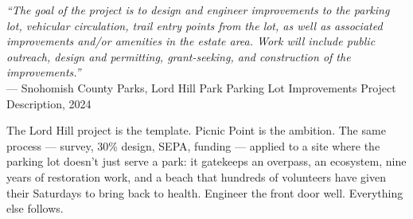 \documentclass[11pt,letterpaper]{article}
\begin{document}
\begin{quotebox}
\textit{``The goal of the project is to design and engineer improvements to the parking lot, vehicular circulation, trail entry points from the lot, as well as associated improvements and/or amenities in the estate area. Work will include public outreach, design and permitting, grant-seeking, and construction of the improvements.''}\\[0.5em]
\hspace*{\fill}--- Snohomish County Parks, Lord Hill Park Parking Lot Improvements Project Description, 2024

\vspace{0.8em}
The Lord Hill project is the template. Picnic Point is the ambition. The same process --- survey, 30\% design, SEPA, funding --- applied to a site where the parking lot doesn't just serve a park: it gatekeeps an overpass, an ecosystem, nine years of restoration work, and a beach that hundreds of volunteers have given their Saturdays to bring back to health. Engineer the front door well. Everything else follows.
\end{quotebox}
\end{document}
